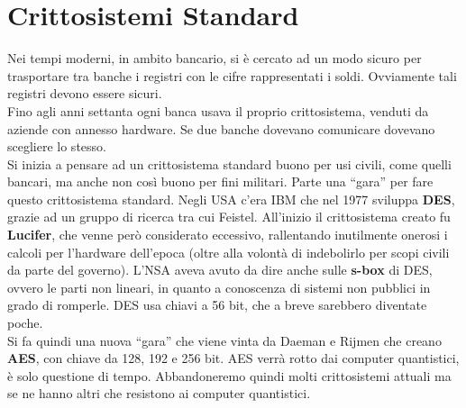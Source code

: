 \documentclass[a4paper,12pt, oneside]{book}
\begin{document}
\section{Crittosistemi Standard}
Nei tempi moderni, in ambito bancario, si è cercato ad un modo sicuro per
trasportare tra banche i registri con le cifre rappresentati i soldi. Ovviamente
tali registri devono essere sicuri.\\
Fino agli anni settanta ogni banca usava il proprio crittosistema, venduti da
aziende con annesso hardware. Se due banche dovevano comunicare dovevano
scegliere lo stesso.\\
Si inizia a pensare ad un crittosistema standard buono per usi civili, come
quelli bancari, ma anche non così buono per fini militari. Parte una ``gara''
per fare questo crittosistema standard. Negli USA c'era IBM che nel 1977
sviluppa \textbf{DES}, grazie ad un gruppo di ricerca tra cui
Feistel. All'inizio il crittosistema creato fu \textbf{Lucifer}, che venne però
considerato eccessivo, rallentando inutilmente onerosi i calcoli per l'hardware
dell'epoca (oltre alla volontà di indebolirlo per scopi civili da parte del
governo). L'NSA aveva avuto da dire anche sulle \textbf{s-box} di DES, ovvero le
parti 
non lineari, in quanto a conoscenza di sistemi non pubblici in grado di
romperle. DES usa chiavi a 56 bit, che a breve sarebbero diventate poche.\\
Si fa quindi una nuova ``gara'' che viene vinta da Daeman e Rijmen che creano
\textbf{AES}, con chiave da 128, 192 e 256 bit. AES verrà rotto dai computer
quantistici, è solo questione di tempo. Abbandoneremo quindi molti crittosistemi
attuali ma se ne hanno altri che resistono ai computer quantistici.
\end{document}
